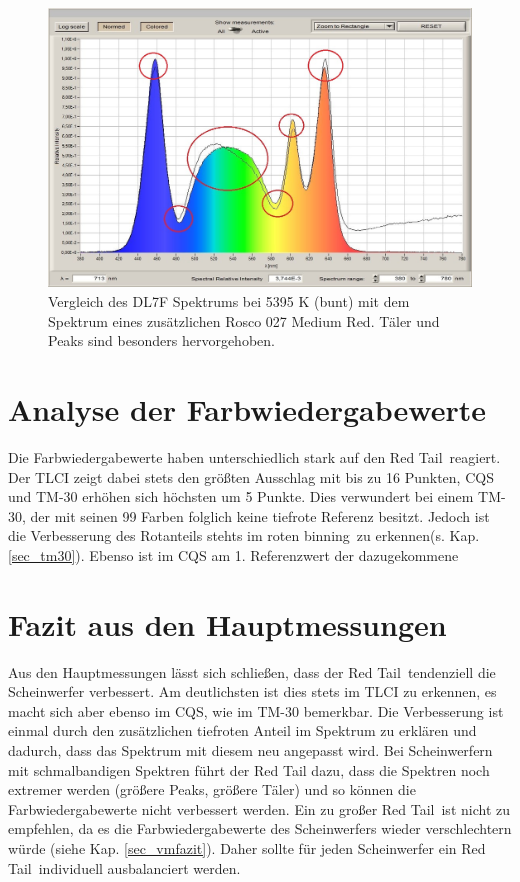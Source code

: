 \begin{figure}[H]     %
\centering
\includegraphics[width=1.0\textwidth]{bilder/dl7f1} 
\caption {Vergleich des DL7F Spektrums bei 5395 K (bunt) mit dem Spektrum eines zusätzlichen Rosco 027 \glqq Medium Red\grqq . Täler und Peaks sind besonders hervorgehoben.}\label{b_dl7f1}
\end{figure}

\section{Analyse der Farbwiedergabewerte}
\label{sec_analfww}
Die Farbwiedergabewerte haben unterschiedlich stark auf den \glqq Red Tail\grqq\ reagiert. Der TLCI zeigt dabei stets den größten Ausschlag mit bis zu 16 Punkten, CQS und TM-30 erhöhen sich höchsten um 5 Punkte. Dies verwundert bei einem TM-30, der mit seinen 99 Farben folglich keine tiefrote Referenz besitzt. Jedoch ist die Verbesserung des Rotanteils stehts im roten \glqq binning\grqq\ zu erkennen(s. Kap. \ref{sec_tm30}). Ebenso ist im CQS am 1. Referenzwert der dazugekommene  


\section{Fazit aus den Hauptmessungen}
\label{sec_fazithm}
Aus den Hauptmessungen lässt sich schließen, dass der \glqq Red Tail\grqq\ tendenziell die Scheinwerfer verbessert. Am deutlichsten ist dies stets im TLCI zu erkennen, es macht sich aber ebenso im CQS, wie im TM-30 bemerkbar. Die Verbesserung ist einmal durch den zusätzlichen tiefroten Anteil im Spektrum zu erklären und dadurch, dass das Spektrum mit diesem neu angepasst wird. Bei Scheinwerfern mit schmalbandigen Spektren führt der Red Tail dazu, dass die Spektren noch extremer werden (größere Peaks, größere Täler) und so können die Farbwiedergabewerte nicht verbessert werden. Ein zu großer \glqq Red Tail\grqq\ ist nicht zu empfehlen, da es die Farbwiedergabewerte des Scheinwerfers wieder verschlechtern würde (siehe Kap. \ref{sec_vmfazit}). Daher sollte für jeden Scheinwerfer ein \glqq Red Tail\grqq\ individuell ausbalanciert werden.




